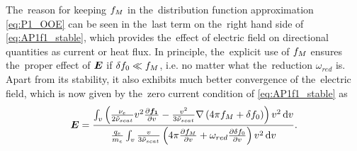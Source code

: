 The~reason for keeping $f_M$ in the~distribution function approximation
\eqref{eq:P1_OOE} can be seen in the~last term on the~right hand side of 
\eqref{eq:AP1f1_stable}, which provides the~effect of electric field on
directional quantities as current or heat flux. In principle, the~explicit use
of $f_M$ ensures the~proper effect of $\boldsymbol{E}$ if $\delta f_0 \ll f_M$, i.e.
no matter what the~reduction $\omega_{red}$ is. Apart from its stability,
it also exhibits much better convergence of the~electric field, which is now
given by the~zero current condition of \eqref{eq:AP1f1_stable} as
\begin{equation}
  \boldsymbol{E} =
  \frac{\int_{v} \left(\frac{\nu_{e}}{2\tilde{\nu}_{scat}}v^2\frac{\partial{\boldsymbol{f_1}}}{\partial{v}}
  - \frac{v^2}{3\tilde{\nu}_{scat}}
  \nabla\left(4\pi f_M + \delta f_0\right)\right) v^2\, \text{d}v}
  {\frac{q_e}{m_e}\int_{v} \frac{v}
  {3\tilde{\nu}_{scat}}
  \left(4\pi\frac{\partial{f_M}}{\partial{v}} + \omega_{red} \frac{\partial{\delta f_0}}{\partial{v}}\right)
  v^2\, \text{d}v} .
  \label{eq:AP1_Efield_stable}
\end{equation}

